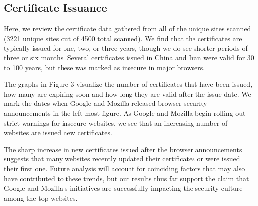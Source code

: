\documentclass{easychair}
\begin{document}
\subsection{Certificate Issuance}

Here, we review the certificate data gathered from all of the unique 
sites scanned (3221 unique sites out of 4500 total scanned). We find 
that the certificates are typically issued for one, two, or 
three years, though we do see shorter periods of three or six months. 
Several certificates issued in China and Iran were valid for 30 to 100 
years, but these was marked as insecure in major browsers.

The graphs in Figure 3 visualize the number of certificates that have 
been issued, how many are expiring soon and how long they are valid 
after the issue date. We mark the dates when Google and Mozilla released
browser security announcements in the left-most figure. As Google and 
Mozilla begin rolling out strict warnings for insecure websites, we see 
that an increasing number of websites are issued new certificates.

The sharp increase in new certificates issued after the browser 
announcements suggests that many websites recently updated their 
certificates or were issued their first one. Future analysis will 
account for coinciding factors that may also have contributed to these 
trends, but our results thus far support the claim that Google and 
Mozilla's initiatives are successfully impacting the security culture 
among the top websites.
\end{document}
